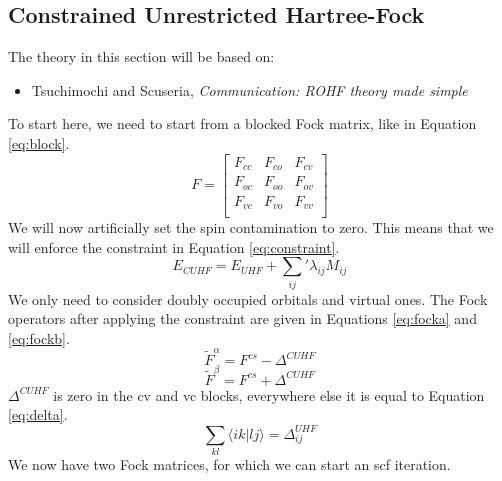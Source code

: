 \subsection{Constrained Unrestricted Hartree-Fock}
The theory in this section will be based on:
\begin{itemize}
    \item Tsuchimochi and Scuseria, \textit{Communication: ROHF theory made simple}
\end{itemize}
To start here, we need to start from a blocked Fock matrix, like in Equation \eqref{eq:block}.
\begin{equation}
    F = \begin{bmatrix}\label{eq:block}
        F_{cc} & F_{co} & F_{cv} \\
        F_{oc} & F_{oo} & F_{ov} \\
        F_{vc} & F_{vo} & F_{vv} \\
    \end{bmatrix}
\end{equation}
We will now artificially set the spin contamination to zero. This means that we will enforce the constraint in Equation \eqref{eq:constraint}.
\begin{equation}\label{eq:constraint}
    E_{CUHF} = E_{UHF} + \sum_{ij}'\lambda_{ij}M_{ij}
\end{equation}
We only need to consider doubly occupied orbitals and virtual ones. The Fock operators after applying the constraint are given in Equations \eqref{eq:focka} and \eqref{eq:fockb}.
\begin{equation}\label{eq:focka}
    \widetilde{F}^\alpha = F^{cs} - \Delta^{CUHF}
\end{equation}
\begin{equation}
    \widetilde{F}^\beta = F^{cs} + \Delta^{CUHF}
\end{equation}
$\Delta^{CUHF}$ is zero in the cv and vc blocks, everywhere else it is equal to Equation \eqref{eq:delta}.
\begin{equation}\label{eq:delta}
    \sum_{kl} \langle ik | lj \rangle = \Delta^{UHF}_{ij}
\end{equation}
We now have two Fock matrices, for which we can start an scf iteration.